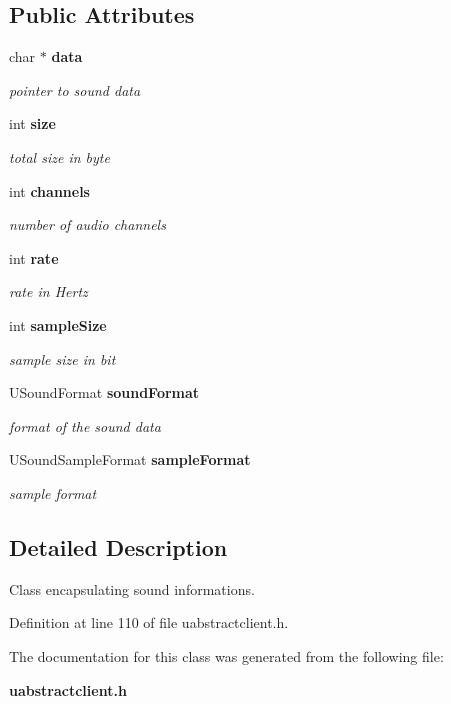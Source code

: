 \subsection*{Public Attributes}
\begin{CompactItemize}
\item 
char $\ast$ {\bf data}\label{classUSound_o0}

\begin{CompactList}\small\item\em pointer to sound data \item\end{CompactList}\item 
int {\bf size}\label{classUSound_o1}

\begin{CompactList}\small\item\em total size in byte \item\end{CompactList}\item 
int {\bf channels}\label{classUSound_o2}

\begin{CompactList}\small\item\em number of audio channels \item\end{CompactList}\item 
int {\bf rate}\label{classUSound_o3}

\begin{CompactList}\small\item\em rate in Hertz \item\end{CompactList}\item 
int {\bf sample\-Size}\label{classUSound_o4}

\begin{CompactList}\small\item\em sample size in bit \item\end{CompactList}\item 
USound\-Format {\bf sound\-Format}\label{classUSound_o5}

\begin{CompactList}\small\item\em format of the sound data \item\end{CompactList}\item 
USound\-Sample\-Format {\bf sample\-Format}\label{classUSound_o6}

\begin{CompactList}\small\item\em sample format \item\end{CompactList}\end{CompactItemize}


\subsection{Detailed Description}
Class encapsulating sound informations. 



Definition at line 110 of file uabstractclient.h.

The documentation for this class was generated from the following file:\begin{CompactItemize}
\item 
{\bf uabstractclient.h}\end{CompactItemize}
